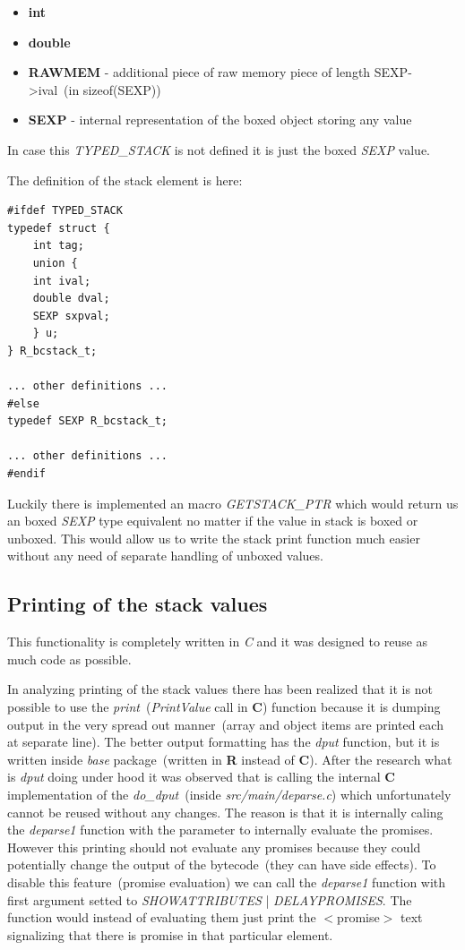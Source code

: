 \documentclass[thesis=M,english]{FITthesis}[2018/10/20]
\begin{document}
\begin{itemize}
	\item \textbf{int}
	\item \textbf{double}
	\item \textbf{RAWMEM} - additional piece of raw memory piece of length SEXP->ival~(in sizeof(SEXP))
	\item \textbf{SEXP} - internal representation of the boxed object storing any value
\end{itemize}
	
In case this \textit{TYPED{\_}STACK} is not defined it is just the boxed \textit{SEXP} value.

The definition of the stack element is here:

\begin{lstlisting}
#ifdef TYPED_STACK
typedef struct {
    int tag;
    union {
	int ival;
	double dval;
	SEXP sxpval;
    } u;
} R_bcstack_t;

... other definitions ...
#else
typedef SEXP R_bcstack_t;

... other definitions ...
#endif
\end{lstlisting}

Luckily there is implemented an macro \textit{GETSTACK{\_}PTR} which would return us an boxed \textit{SEXP} type equivalent no matter if the value in stack is boxed or unboxed. This would allow us to write the stack print function much easier without any need of separate handling of unboxed values.

\subsection{Printing of the stack values}\label{printing-stack-values}

This functionality is completely written in \textit{C} and it was designed to reuse as much code as possible. 

In analyzing printing of the stack values there has been realized that it is not possible to use the \textit{print}~(\textit{PrintValue} call in \textbf{C}) function because it is dumping output in the very spread out manner~(array and object items are printed each at separate line). The better output formatting has the \textit{dput} function, but it is written inside \textit{base} package~(written in \textbf{R} instead of \textbf{C}). After the research what is \textit{dput} doing under hood it was observed that is calling the internal \textbf{C} implementation of the \textit{do{\_}dput}~(inside \textit{src/main/deparse.c}) which unfortunately cannot be reused without any changes. The reason is that it is internally caling the \textit{deparse1} function with the parameter to internally evaluate the promises. However this printing should not evaluate any promises because they could  potentially change the output of the bytecode~(they can have side effects). To disable this feature~(promise evaluation) we can call the \textit{deparse1} function with first argument setted to \textit{SHOWATTRIBUTES} | \textit{DELAYPROMISES}. The function would instead of evaluating them just print the $<$promise$>$ text signalizing that there is promise in that particular element.
\end{document}
